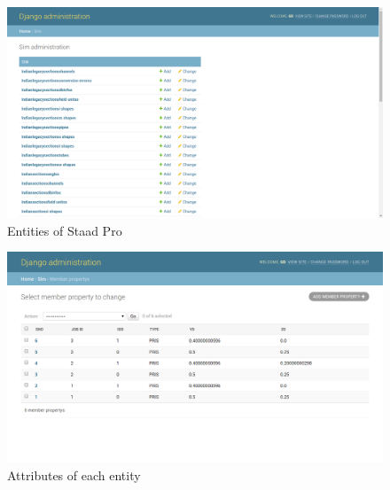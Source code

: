 \begin{figure}[h!]                                                      
\begin{center}                                                          
\includegraphics[scale=0.35]{images/admin2.png}                        
\caption{Entities of Staad Pro}                            
\end{center}                                                            
\end{figure} 

\begin{figure}[h!]                                                      
\begin{center}                                                          
\includegraphics[scale=0.35]{images/admin3.png}                        
\caption{Attributes of each entity}                            
\end{center}                                                            
\end{figure} 

